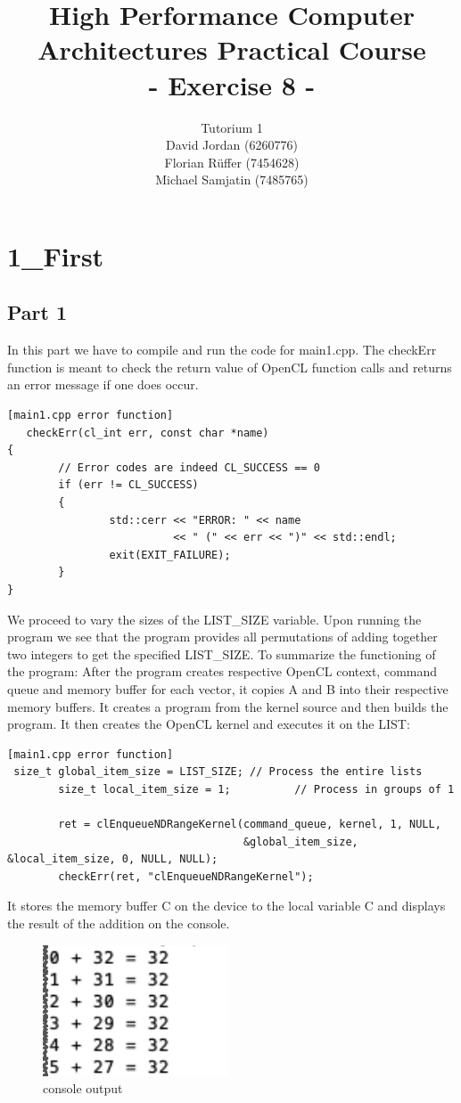 \documentclass{article}
\title{\textbf{High Performance Computer Architectures Practical Course \\ - Exercise 8 -} \\[10mm]}
\author{Tutorium 1 \\[10mm] David Jordan (6260776) \\[1mm] Florian Rüffer (7454628) \\[1mm] Michael Samjatin (7485765) \\[10mm]}
\begin{document}
\maketitle
\newpage
\section*{1\_First}
\subsection*{Part 1}
In this part we have to compile and run the code for main1.cpp. The checkErr function is meant to check the return value of OpenCL function calls and returns an error message if one does occur.

\begin{lstlisting}[main1.cpp error function]
   checkErr(cl_int err, const char *name)
{
        // Error codes are indeed CL_SUCCESS == 0
        if (err != CL_SUCCESS)
        {
                std::cerr << "ERROR: " << name
                          << " (" << err << ")" << std::endl;
                exit(EXIT_FAILURE);
        }
}
\end{lstlisting}
We proceed to vary the sizes of the LIST\_SIZE variable. Upon running the program we see that the program provides all permutations of adding together two integers to get the specified LIST\_SIZE. To summarize the functioning of the program:
After the program creates respective OpenCL context, command queue and memory buffer for each vector, it copies A and B into their respective memory buffers. It creates a program from the kernel source and then builds the program. It then creates the OpenCL kernel and executes it on the LIST:
\begin{lstlisting}[main1.cpp error function]
 size_t global_item_size = LIST_SIZE; // Process the entire lists
        size_t local_item_size = 1;          // Process in groups of 1

        ret = clEnqueueNDRangeKernel(command_queue, kernel, 1, NULL,
                                     &global_item_size, &local_item_size, 0, NULL, NULL);
        checkErr(ret, "clEnqueueNDRangeKernel");
\end{lstlisting}

It stores the memory buffer C on the device to the local variable C and displays the result of the addition on the console.

\begin{figure}[H]
    \centering
    \includegraphics[scale=0.6]{opencl_1.png} 
    \caption{console output}
    \label{fig:graph}
\end{figure}
\end{document}
